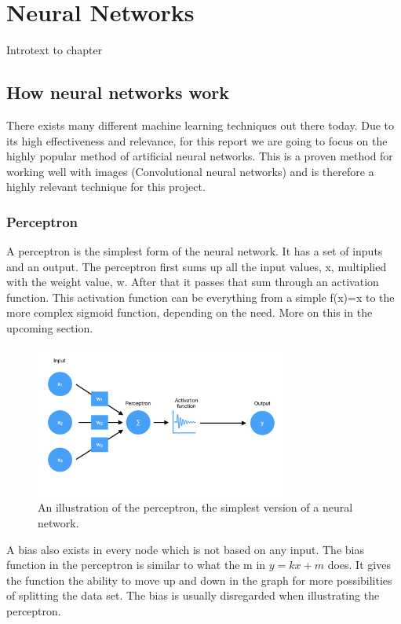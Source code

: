 \chapter{Neural Networks}
Introtext to chapter
\section{How neural networks work}
There exists many different machine learning techniques out there today. Due to its high effectiveness and relevance, for this report we are going to focus on the highly popular method of artificial neural networks.
This is a proven method for working well with images (Convolutional neural networks) and is therefore a highly 
relevant technique for this project.

\subsection{Perceptron}
A perceptron is the simplest form of the neural network. It has a set of inputs and an output.
The perceptron first sums up all the input values, x, multiplied with the weight value, w.
After that it passes that sum through an activation function. This activation function can be everything from a simple f(x)=x to the more complex sigmoid function, depending on the need. More on this in the upcoming section.

\begin{figure}[hbtp]
\begin{center}
\includegraphics[width = 0.75\textwidth]{./Images/perceptron.jpg} 
\caption{An illustration of the perceptron, the simplest version of a neural network.}
\end{center}
\end{figure}

A bias also exists in every node which is not based on any input. The bias function in the perceptron is similar to what the m in $y = kx + m$ does. It gives the function the ability to move up and down in the graph for more possibilities of splitting the data set. The bias is usually disregarded when illustrating the perceptron.

